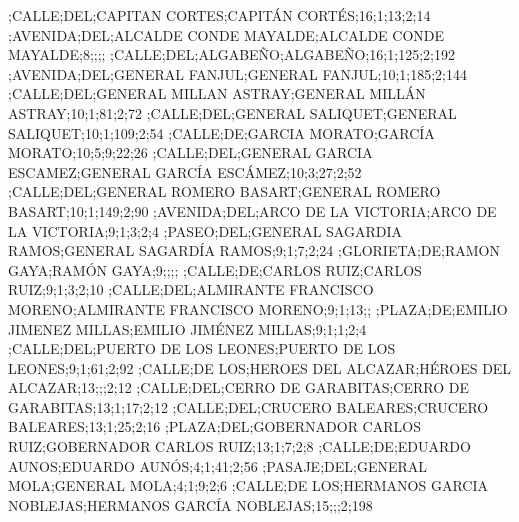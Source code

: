 \begin{tiny}
;CALLE;DEL;CAPITAN CORTES;CAPITÁN CORTÉS;16;1;13;2;14
;AVENIDA;DEL;ALCALDE CONDE MAYALDE;ALCALDE CONDE MAYALDE;8;;;;
;CALLE;DEL;ALGABEÑO;ALGABEÑO;16;1;125;2;192
;AVENIDA;DEL;GENERAL FANJUL;GENERAL FANJUL;10;1;185;2;144
;CALLE;DEL;GENERAL MILLAN ASTRAY;GENERAL MILLÁN ASTRAY;10;1;81;2;72
;CALLE;DEL;GENERAL SALIQUET;GENERAL SALIQUET;10;1;109;2;54
;CALLE;DE;GARCIA MORATO;GARCÍA MORATO;10;5;9;22;26
;CALLE;DEL;GENERAL GARCIA ESCAMEZ;GENERAL GARCÍA ESCÁMEZ;10;3;27;2;52
;CALLE;DEL;GENERAL ROMERO BASART;GENERAL ROMERO BASART;10;1;149;2;90
;AVENIDA;DEL;ARCO DE LA VICTORIA;ARCO DE LA VICTORIA;9;1;3;2;4
;PASEO;DEL;GENERAL SAGARDIA RAMOS;GENERAL SAGARDÍA RAMOS;9;1;7;2;24
;GLORIETA;DE;RAMON GAYA;RAMÓN GAYA;9;;;;
;CALLE;DE;CARLOS RUIZ;CARLOS RUIZ;9;1;3;2;10
;CALLE;DEL;ALMIRANTE FRANCISCO MORENO;ALMIRANTE FRANCISCO MORENO;9;1;13;;
;PLAZA;DE;EMILIO JIMENEZ MILLAS;EMILIO JIMÉNEZ MILLAS;9;1;1;2;4
;CALLE;DEL;PUERTO DE LOS LEONES;PUERTO DE LOS LEONES;9;1;61;2;92
;CALLE;DE LOS;HEROES DEL ALCAZAR;HÉROES DEL ALCAZAR;13;;;2;12
;CALLE;DEL;CERRO DE GARABITAS;CERRO DE GARABITAS;13;1;17;2;12
;CALLE;DEL;CRUCERO BALEARES;CRUCERO BALEARES;13;1;25;2;16
;PLAZA;DEL;GOBERNADOR CARLOS RUIZ;GOBERNADOR CARLOS RUIZ;13;1;7;2;8
;CALLE;DE;EDUARDO AUNOS;EDUARDO AUNÓS;4;1;41;2;56
;PASAJE;DEL;GENERAL MOLA;GENERAL MOLA;4;1;9;2;6
;CALLE;DE LOS;HERMANOS GARCIA NOBLEJAS;HERMANOS GARCÍA NOBLEJAS;15;;;2;198

\end{tiny}
